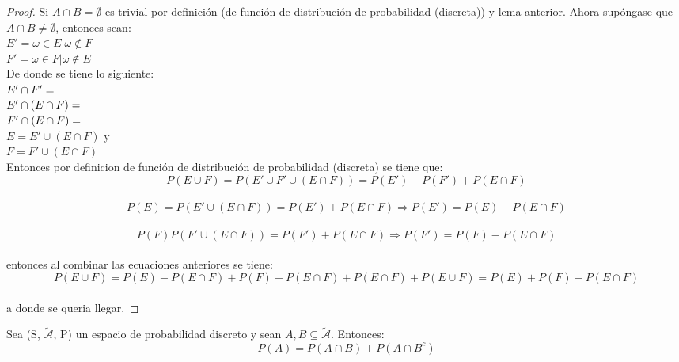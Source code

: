 \begin{proof}
	Si $A\cap B=\emptyset$ es trivial por definición (de función de distribución de probabilidad (discreta)) y lema anterior. Ahora supóngase que $A\cap B\neq\emptyset$, entonces sean:\\
	$E'={\omega\in E|\omega\notin F }$\\
	$F'={\omega\in F|\omega\notin E}$\\
	
	De donde se tiene lo siguiente:\\
	$E'\cap F'=\empty$\\
	$E'\cap(E\cap F)=\empty$\\
	$F'\cap(E\cap F)=\empty$\\
	$E=E'\cup(E\cap F)$ y\\
	$F=F'\cup(E\cap F)$\\
	
	Entonces por definicion de función de distribución de probabilidad (discreta) se tiene que:
	\begin{equation}\label{EyF}
	P(E\cup F)=P(E'\cup F'\cup (E\cap F))=P(E')+P(F')+P(E\cap F)
	\end{equation}\\
	\begin{equation}\label{E}
	P(E)=P(E'\cup (E\cap F))=P(E')+P(E\cap F)\Longrightarrow P(E')=P(E)-P(E\cap F)
	\end{equation}\\
	\begin{equation}\label{F}
	P(F)P(F'\cup (E\cap F))=P(F')+P(E\cap F)\Longrightarrow P(F')=P(F)-P(E\cap F)
	\end{equation}\\
	entonces al combinar las ecuaciones anteriores se tiene:\\
	\begin{equation}\label{key}
	P(E\cup F)=P(E)-P(E\cap F)+P(F)-P(E\cap F)+P(E\cap F)+P(E\cup F)=P(E)+P(F)-P(E\cap F)
	\end{equation}\\
	a donde se queria llegar.
\end{proof}


\begin{lem} Sea (S, $\mathcal{\tilde{A}}$, P)  un espacio de probabilidad discreto y sean $A, B\subseteq \mathcal{\tilde{A}}$. Entonces: \begin{equation}\label{pA}
	P(A)=P(A\cap B)+P(A\cap B^{c})
	\end{equation}
\end{lem} 

